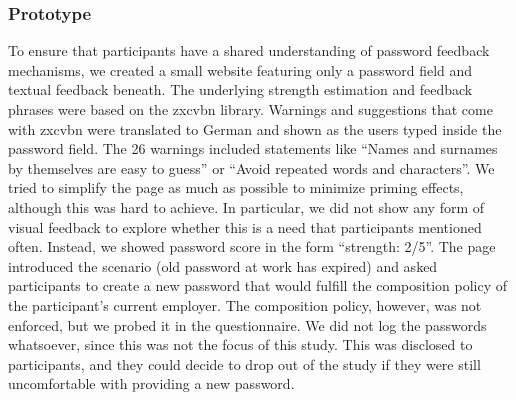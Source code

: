 
\subsubsection{Prototype}
To ensure that participants have a shared understanding of password feedback mechanisms, we created a small website featuring only a password field and textual feedback beneath. The underlying strength estimation and feedback phrases were based on the zxcvbn library. Warnings and suggestions that come with zxcvbn were translated to German and shown as the users typed inside the password field. The 26 warnings included statements like ``Names and surnames by themselves are easy to guess'' or ``Avoid repeated words and characters''. We tried to simplify the page as much as possible to minimize priming effects, although this was hard to achieve. In particular, we did not show any form of visual feedback to explore whether this is a need that participants mentioned often. Instead, we showed password score in the form ``strength: 2/5''.  The page introduced the scenario (old password at work has expired) and asked participants to create a new password that would fulfill the composition policy of the participant's current employer. The composition policy, however, was not enforced, but we probed it in the questionnaire. We did not log the passwords whatsoever, since this was not the focus of this study. This was disclosed to participants, and they could decide to drop out of the study if they were still uncomfortable with providing a new password.  

